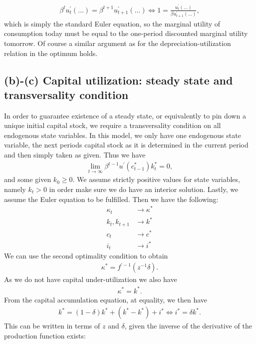 \documentclass[a4paper]{article}
\theoremstyle{definition}
\begin{document}
	\begin{align}
	\beta^t u^\prime_t(\dots) = \beta^{t+1} u_{t+1}^\prime(\dots) \Leftrightarrow 1 = \frac{u^\prime_t(\dots)}{\beta u^\prime_{t+1}(\dots)},
	\end{align}	
which is simply the standard Euler equation, so the marginal utility of consumption today must be equal to the one-period discounted marginal utility tomorrow. Of course a similar argument as for the depreciation-utilization relation in the optimum holds.
\subsection{(b)-(c) Capital utilization: steady state and transversality condition}
In order to guarantee existence of a steady state, or equivalently to pin down a unique initial capital stock, we require a transversality condition on all endogenous state variables. In this model, we only have one endogenous state variable, the next periods capital stock as it is determined in the current period and then simply taken as given. Thus we have
	\begin{align}
	\lim\limits_{t\rightarrow\infty} \beta^{t-1} u^\prime(c_{t-1}^*)k_t^* = 0,
	\end{align}
and some given $k_0 \geq 0$. We assume strictly positive values for state variables, namely $k_t > 0$ in order make sure we do have an interior solution. Lastly, we assume the Euler equation to be fulfilled. Then we have the following:
	\begin{align*}
	\kappa_t 					&\rightarrow \kappa^* \\
	k_t ,k_{t+1}				&\rightarrow k^* \\
	c_t 						&\rightarrow c^* \\
	i_t 							&\rightarrow i^* 
	\end{align*}
We can use the second optimality condition to obtain
	\begin{align*}
	\kappa^* = f^{\prime -1}(z^{-1}\delta).
	\end{align*}
As we do not have capital under-utilization we also have
	\begin{align*}
	\kappa^* = k^*.
	\end{align*}
From the capital accumulation equation, at equality, we then have
	\begin{align*}
	k^* = (1-\delta)k^* + (k^* - k^*) + i^* \Leftrightarrow i^* = \delta k^*.
	\end{align*}	
This can be written in terms of $z$ and $\delta$, given the inverse of the derivative of the production function exists:
\end{document}
